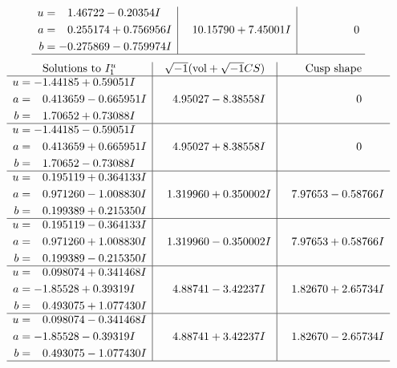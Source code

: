 \documentclass[1p]{elsarticle_modified}
\theoremstyle{definition}
\newcommand{\I}{\sqrt{-1}}
\begin{document}
$$\begin{array}{c|c|c}
\begin{aligned}
u &= \phantom{-}1.46722 - 0.20354 I \\
a &= \phantom{-}0.255174 + 0.756956 I \\
b &= -0.275869 - 0.759974 I\end{aligned}
 & \phantom{-}10.15790 + 7.45001 I & \phantom{-0.000000 } 0\\
 \hline 
 \end{array}$$\newpage$$\begin{array}{c|c|c}  
\text{Solutions to }I^u_{1}& \I (\text{vol} + \sqrt{-1}CS) & \text{Cusp shape}\\
 \hline 
\begin{aligned}
u &= -1.44185 + 0.59051 I \\
a &= \phantom{-}0.413659 - 0.665951 I \\
b &= \phantom{-}1.70652 + 0.73088 I\end{aligned}
 & \phantom{-}4.95027 - 8.38558 I & \phantom{-0.000000 } 0 \\ \hline\begin{aligned}
u &= -1.44185 - 0.59051 I \\
a &= \phantom{-}0.413659 + 0.665951 I \\
b &= \phantom{-}1.70652 - 0.73088 I\end{aligned}
 & \phantom{-}4.95027 + 8.38558 I & \phantom{-0.000000 } 0 \\ \hline\begin{aligned}
u &= \phantom{-}0.195119 + 0.364133 I \\
a &= \phantom{-}0.971260 - 1.008830 I \\
b &= \phantom{-}0.199389 + 0.215350 I\end{aligned}
 & \phantom{-}1.319960 + 0.350002 I & \phantom{-}7.97653 - 0.58766 I \\ \hline\begin{aligned}
u &= \phantom{-}0.195119 - 0.364133 I \\
a &= \phantom{-}0.971260 + 1.008830 I \\
b &= \phantom{-}0.199389 - 0.215350 I\end{aligned}
 & \phantom{-}1.319960 - 0.350002 I & \phantom{-}7.97653 + 0.58766 I \\ \hline\begin{aligned}
u &= \phantom{-}0.098074 + 0.341468 I \\
a &= -1.85528 + 0.39319 I \\
b &= \phantom{-}0.493075 + 1.077430 I\end{aligned}
 & \phantom{-}4.88741 - 3.42237 I & \phantom{-}1.82670 + 2.65734 I \\ \hline\begin{aligned}
u &= \phantom{-}0.098074 - 0.341468 I \\
a &= -1.85528 - 0.39319 I \\
b &= \phantom{-}0.493075 - 1.077430 I\end{aligned}
 & \phantom{-}4.88741 + 3.42237 I & \phantom{-}1.82670 - 2.65734 I\\
 \hline 
 \end{array}$$\newpage\newpage\renewcommand{\arraystretch}{1}
\end{document}
